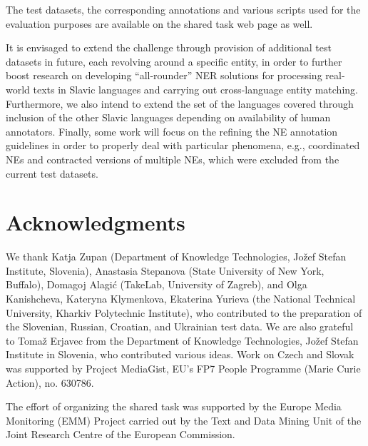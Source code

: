 \documentclass[11pt]{article}
\begin{document}
The test datasets, the corresponding annotations and various scripts used for the evaluation purposes 
are available on the shared task web page as well.

It is envisaged to extend the challenge through provision of additional test datasets in future, each revolving
around a specific entity, in order to further boost research on developing ``all-rounder'' NER solutions for 
processing real-world texts in Slavic languages and carrying out cross-language entity matching. Furthermore, 
we also intend to extend the set of the languages covered through inclusion of the other Slavic languages 
depending on availability of human annotators. Finally, some work will focus on the refining the NE annotation 
guidelines in order to properly deal with particular phenomena, e.g.,  coordinated NEs and contracted versions 
of multiple NEs, which were excluded from the current test datasets.


\section*{Acknowledgments}


We thank Katja Zupan (Department of Knowledge Technologies, Jožef Stefan
Institute, Slovenia), Anastasia Stepanova (State University of New York,
Buffalo), Domagoj Alagić (TakeLab, University of Zagreb), and Olga
Kanishcheva, Kateryna Klymenkova, Ekaterina Yurieva (the National
Technical University, Kharkiv Polytechnic Institute), who contributed to
the preparation of the Slovenian, Russian, Croatian, and Ukrainian test
data.  
%
We are also grateful to Tomaž Erjavec from the Department of Knowledge
Technologies, Jožef Stefan Institute in Slovenia, who contributed various
ideas.
%
Work on Czech and Slovak was supported by Project MediaGist, EU's FP7
People Programme (Marie Curie Action), no. 630786.

The effort of organizing the shared task was supported by the Europe Media Monitoring (EMM) 
Project carried out by the Text and Data Mining Unit of the Joint Research Centre of the 
European Commission.



\end{document}
